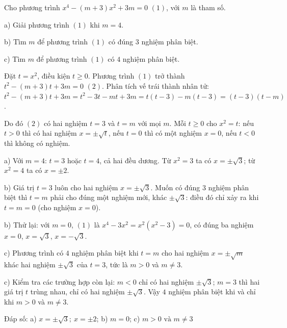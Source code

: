 \begin{problem}[9DS-PT2-051]
Cho phương trình $x^4 - (m + 3)x^2 + 3m = 0$ $(1)$, với $m$ là tham số.

a) Giải phương trình $(1)$ khi $m = 4$.

b) Tìm $m$ để phương trình $(1)$ có đúng $3$ nghiệm phân biệt.

c) Tìm $m$ để phương trình $(1)$ có $4$ nghiệm phân biệt.

\begin{solution}
Đặt $t = x^2$, điều kiện $t \geq 0$. Phương trình $(1)$ trở thành $t^2 - (m + 3)t + 3m = 0$ $(2)$. Phân tích vế trái thành nhân tử: $t^2 - (m + 3)t + 3m = t^2 - 3t - mt + 3m = t(t - 3) - m(t - 3) = (t - 3)(t - m)$.

Do đó $(2)$ có hai nghiệm $t = 3$ và $t = m$ với mọi $m$. Mỗi $t \geq 0$ cho $x^2 = t$: nếu $t > 0$ thì có hai nghiệm $x = \pm\sqrt{t}$, nếu $t = 0$ thì có một nghiệm $x = 0$, nếu $t < 0$ thì không có nghiệm.

a) Với $m = 4$: $t = 3$ hoặc $t = 4$, cả hai đều dương. Từ $x^2 = 3$ ta có $x = \pm\sqrt{3}$; từ $x^2 = 4$ ta có $x = \pm 2$.

b) Giá trị $t = 3$ luôn cho hai nghiệm $x = \pm\sqrt{3}$. Muốn có đúng $3$ nghiệm phân biệt thì $t = m$ phải cho đúng một nghiệm mới, khác $\pm\sqrt{3}$: điều đó chỉ xảy ra khi $t = m = 0$ (cho nghiệm $x = 0$).

b) Thử lại: với $m = 0$, $(1)$ là $x^4 - 3x^2 = x^2(x^2 - 3) = 0$, có đúng ba nghiệm $x = 0$, $x = \sqrt{3}$, $x = -\sqrt{3}$.

c) Phương trình có $4$ nghiệm phân biệt khi $t = m$ cho hai nghiệm $x = \pm\sqrt{m}$ khác hai nghiệm $\pm\sqrt{3}$ của $t = 3$, tức là $m > 0$ và $m \neq 3$.

c) Kiểm tra các trường hợp còn lại: $m < 0$ chỉ có hai nghiệm $\pm\sqrt{3}$; $m = 3$ thì hai giá trị $t$ trùng nhau, chỉ có hai nghiệm $\pm\sqrt{3}$. Vậy $4$ nghiệm phân biệt khi và chỉ khi $m > 0$ và $m \neq 3$.

Đáp số: a) $\boxed{x = \pm\sqrt{3};\ x = \pm 2}$; b) $\boxed{m = 0}$; c) $\boxed{m > 0 \text{ và } m \neq 3}$
\end{solution}
\end{problem}


